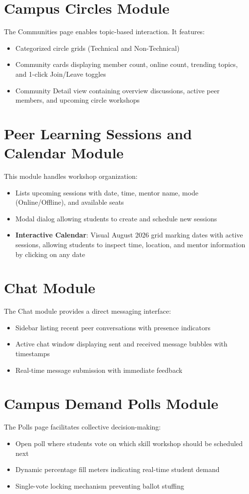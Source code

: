 \documentclass[12pt,a4paper]{report}
\begin{document}
\section{Campus Circles Module}
The Communities page enables topic-based interaction.
It features:
\begin{itemize}
    \item Categorized circle grids (Technical and Non-Technical)
    \item Community cards displaying member count, online count, trending topics, and 1-click Join/Leave toggles
    \item Community Detail view containing overview discussions, active peer members, and upcoming circle workshops
\end{itemize}

\section{Peer Learning Sessions and Calendar Module}
This module handles workshop organization:
\begin{itemize}
    \item Lists upcoming sessions with date, time, mentor name, mode (Online/Offline), and available seats
    \item Modal dialog allowing students to create and schedule new sessions
    \item \textbf{Interactive Calendar}: Visual August 2026 grid marking dates with active sessions, allowing students to inspect time, location, and mentor information by clicking on any date
\end{itemize}

\section{Chat Module}
The Chat module provides a direct messaging interface:
\begin{itemize}
    \item Sidebar listing recent peer conversations with presence indicators
    \item Active chat window displaying sent and received message bubbles with timestamps
    \item Real-time message submission with immediate feedback
\end{itemize}

\section{Campus Demand Polls Module}
The Polls page facilitates collective decision-making:
\begin{itemize}
    \item Open poll where students vote on which skill workshop should be scheduled next
    \item Dynamic percentage fill meters indicating real-time student demand
    \item Single-vote locking mechanism preventing ballot stuffing
\end{itemize}
\end{document}
